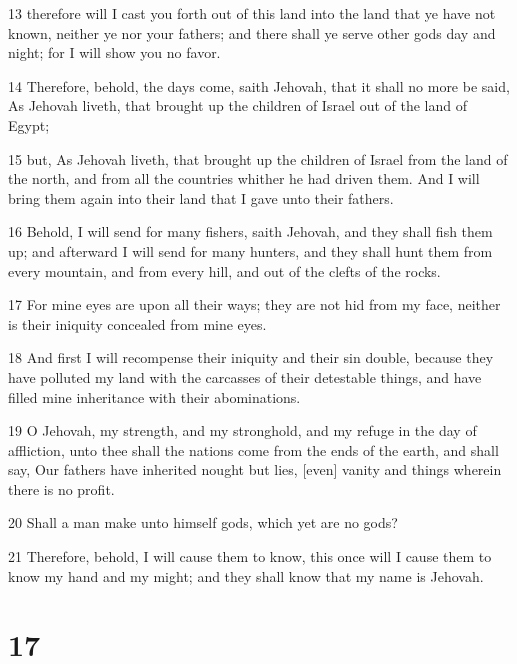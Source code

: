 \par 13 therefore will I cast you forth out of this land into the land that ye have not known, neither ye nor your fathers; and there shall ye serve other gods day and night; for I will show you no favor.
\par 14 Therefore, behold, the days come, saith Jehovah, that it shall no more be said, As Jehovah liveth, that brought up the children of Israel out of the land of Egypt;
\par 15 but, As Jehovah liveth, that brought up the children of Israel from the land of the north, and from all the countries whither he had driven them. And I will bring them again into their land that I gave unto their fathers.
\par 16 Behold, I will send for many fishers, saith Jehovah, and they shall fish them up; and afterward I will send for many hunters, and they shall hunt them from every mountain, and from every hill, and out of the clefts of the rocks.
\par 17 For mine eyes are upon all their ways; they are not hid from my face, neither is their iniquity concealed from mine eyes.
\par 18 And first I will recompense their iniquity and their sin double, because they have polluted my land with the carcasses of their detestable things, and have filled mine inheritance with their abominations.
\par 19 O Jehovah, my strength, and my stronghold, and my refuge in the day of affliction, unto thee shall the nations come from the ends of the earth, and shall say, Our fathers have inherited nought but lies, [even] vanity and things wherein there is no profit.
\par 20 Shall a man make unto himself gods, which yet are no gods?
\par 21 Therefore, behold, I will cause them to know, this once will I cause them to know my hand and my might; and they shall know that my name is Jehovah.

\chapter{17}

